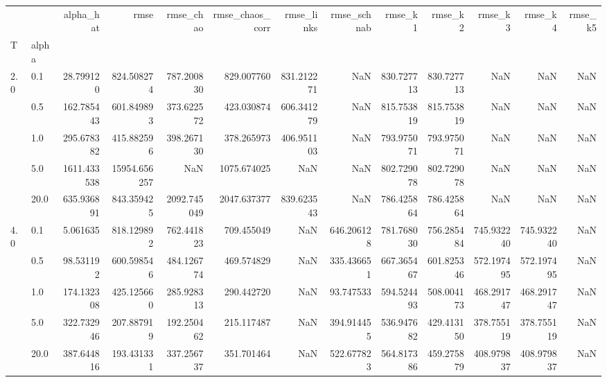 \begin{tabular}{llrrrrrrrrrrr}
\toprule
     &      &    alpha_hat &          rmse &    rmse_chao &  rmse_chaos_corr &  rmse_links &  rmse_schnab &     rmse_k1 &     rmse_k2 &     rmse_k3 &     rmse_k4 &     rmse_k5 \\
T & alpha &              &               &              &                  &             &              &             &             &             &             &             \\
\midrule
2.0  & 0.1  &    28.799120 &    824.508274 &   787.200830 &       829.007760 &  831.212271 &          NaN &  830.727713 &  830.727713 &         NaN &         NaN &         NaN \\
     & 0.5  &   162.785443 &    601.849893 &   373.622572 &       423.030874 &  606.341279 &          NaN &  815.753819 &  815.753819 &         NaN &         NaN &         NaN \\
     & 1.0  &   295.678382 &    415.882596 &   398.267130 &       378.265973 &  406.951103 &          NaN &  793.975071 &  793.975071 &         NaN &         NaN &         NaN \\
     & 5.0  &  1611.433538 &  15954.656257 &          NaN &      1075.674025 &         NaN &          NaN &  802.729078 &  802.729078 &         NaN &         NaN &         NaN \\
     & 20.0 &   635.936891 &    843.359425 &  2092.745049 &      2047.637377 &  839.623543 &          NaN &  786.425864 &  786.425864 &         NaN &         NaN &         NaN \\
4.0  & 0.1  &     5.061635 &    818.129892 &   762.441823 &       709.455049 &         NaN &   646.206128 &  781.768030 &  756.285484 &  745.932240 &  745.932240 &         NaN \\
     & 0.5  &    98.531192 &    600.598546 &   484.126774 &       469.574829 &         NaN &   335.436651 &  667.365467 &  601.825346 &  572.197495 &  572.197495 &         NaN \\
     & 1.0  &   174.132308 &    425.125660 &   285.928313 &       290.442720 &         NaN &    93.747533 &  594.524493 &  508.004173 &  468.291747 &  468.291747 &         NaN \\
     & 5.0  &   322.732946 &    207.887919 &   192.250462 &       215.117487 &         NaN &   394.914455 &  536.947682 &  429.413150 &  378.755119 &  378.755119 &         NaN \\
     & 20.0 &   387.644816 &    193.431331 &   337.256737 &       351.701464 &         NaN &   522.677823 &  564.817386 &  459.275879 &  408.979837 &  408.979837 &         NaN \\

\end{tabular}
